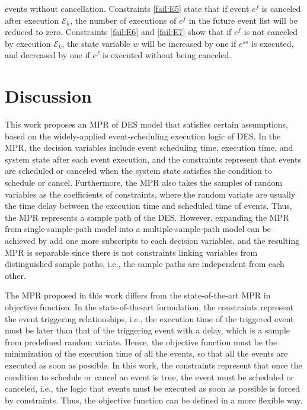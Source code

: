 \documentclass[]{interact}
\theoremstyle{plain}%
\theoremstyle{definition}
\theoremstyle{remark}
\begin{document}
events without cancellation. Constraints \eqref{fail:E5} state that if event $e^{f}$ is canceled after execution $\mathcal{E}_k$, the number of executions of $e^{f}$ in the future event list will be reduced to zero. Constraints \eqref{fail:E6} and \eqref{fail:E7} show that if $e^{f}$ is not canceled by execution $\mathcal{E}_k$, the state variable $w$ will be increased by one if $e^{ss}$ is executed, and decreased by one if $e^{f}$ is executed without being canceled.



\section{Discussion}\label{sec:discussion}

This work proposes an MPR of DES model that satisfies certain assumptions, based on the widely-applied event-scheduling execution logic of DES. In the MPR, the decision variables include event scheduling time, execution time, and system state after each event execution, and the constraints represent that events are scheduled or canceled when the system state satisfies the condition to schedule or cancel. Furthermore, the MPR also takes the samples of random variables as the coefficients of constraints, where the random variate are usually the time delay between the execution time and scheduled time of events. Thus, the MPR represents a sample path of the DES. However, expanding the MPR from single-sample-path model into a multiple-sample-path model can be achieved by add one more subscripts to each decision variables, and the resulting MPR is separable since there is not constraints linking variables from distinguished sample paths, i.e., the sample paths are independent from each other. 

The MPR proposed in this work differs from the state-of-the-art MPR \citep{chan2008optimization} in objective function. In the state-of-the-art formulation, the constraints represent the event triggering relationships, i.e., the execution time of the triggered event must be later than that of the triggering event with a delay, which is a sample from predefined random variate. Hence, the objective function must be the minimization of the execution time of all the events, so that all the events are executed as soon as possible. In this work, the constraints represent that once the condition to schedule or cancel an event is true, the event must be scheduled or canceled, i.e., the logic that events must be executed as soon as possible is forced by constraints. Thus, the objective function can be defined in a more flexible way. 
\end{document}
